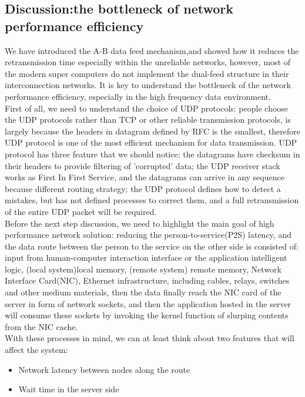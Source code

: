 \documentclass[11pt,openright,a4paper]{report}
\begin{document}
\subsection{Discussion:the bottleneck of network performance efficiency}
We have introduced the A-B data feed mechanism,and showed how it reduces the retransmission time especially within the unreliable networks, however, most of the modern super computers do not implement the dual-feed structure in their interconnection networks. It is key to understand the bottleneck of the network performance efficiency, especially in the high frequency data environment.\\
First of all, we need to understand the choice of UDP protocols: people choose the UDP protocols rather than TCP or other reliable transmission protocols, is largely because the headers in datagram defined by RFC is the smallest\cite{udpprotocol}, therefore UDP protocol is one of the most efficient mechanism for data transmission. UDP protocol has three feature that we should notice: the datagrams have checksum in their headers to provide filtering of 'corrupted' data; the UDP receiver stack works as First In First Service, and the datagrams can arrive in any sequence because different routing strategy; the UDP protocol defines how to detect a mistakes, but has not defined processes to correct them, and a full retransmission of the entire UDP packet will be required.\\
Before the next step discussion, we need to highlight the main goal of high performance network solution: reducing the person-to-service(P2S) latency, and the data route between the person to the service on the other side is consisted of: input from human-computer interaction interface or the application intelligent logic, (local system)local memory, (remote system) remote memory, Network Interface Card(NIC), Ethernet infrastructure, including cables, relays, switches and other medium materials, then the data finally reach the NIC card of the server in form of network sockets, and then the application hosted in the server will consume these sockets by invoking the kernel function of slurping contents from the NIC cache.\\
With these processes in mind, we can at least think about two features that will affect the system:
\begin{itemize}
	\item Network latency between nodes along the route
	\item Wait time in the server side
\end{itemize}
\end{document}
